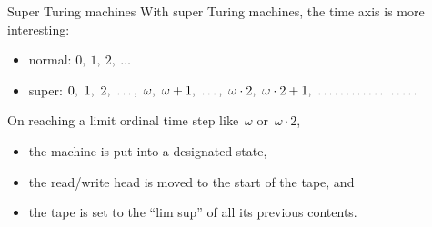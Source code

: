 \documentclass[12pt,compress,ngerman,utf8,t]{beamer}
\renewcommand{\_}{\mathpunct{.}\,}
\begin{document}
\begin{frame}{Super Turing machines}
  With super Turing machines, the time axis is more interesting:
  \begin{itemize}
    \item normal: $0,\ 1,\ 2,\ \ldots$
    \item super:\phantom{rl} $0,\ 1,\ 2,\ \ldots,\ \omega,\ \omega + 1,\ \ldots,\ \omega\cdot2,\ \omega\cdot2
    + 1,\ \makebox[\widthof{R}][l]{$\ldots\ldots\ldots\ldots\ldots\ldots$}$
  \end{itemize}
  \bigskip

  On reaching a limit ordinal time step like~$\omega$ or~$\omega \cdot 2$,
  \begin{itemize}
    \item the machine is put into a designated state,
    \item the read/write head is moved to the start of the tape, and
    \item the tape is set to the ``lim sup'' of all its previous contents.
  \end{itemize}

  \bigskip
  \begin{columns}[t]
    \begin{column}{0.03\textwidth}\end{column}
    \begin{column}{0.03\textwidth}\end{column}
  \end{columns}
\end{frame}
\end{document}
